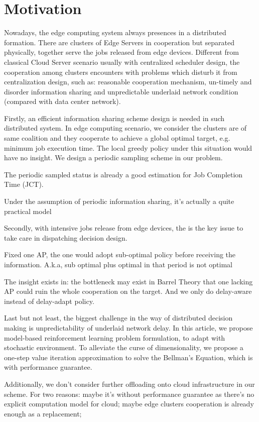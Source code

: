 \section{Motivation}
Nowadays, the edge computing system always presences in a distributed formation.
There are clusters of Edge Servers in cooperation but separated physically, together serve the jobs released from edge devices.
Different from classical Cloud Server scenario usually with centralized scheduler design, the cooperation among clusters encounters with problems which disturb it from centralization design, such as: reasonable cooperation mechanism, un-timely and disorder information sharing and unpredictable underlaid network condition (compared with data center network).

Firstly, an efficient information sharing scheme design is needed in such distributed system.
In edge computing scenario, we consider the clusters are of same coalition and they cooperate to achieve a global optimal target, e.g. minimum job execution time.
The local greedy policy under this situation would have no insight.
We design a periodic sampling scheme in our problem.
\begin{example}
    The periodic sampled status is already a good estimation for Job Completion Time (JCT).
\end{example}
Under the assumption of periodic information sharing, it's actually a quite practical model 

Secondly, with intensive jobs release from edge devices, the \brlatency is the key issue to take care in dispatching decision design.
\begin{example}
    Fixed one AP, the one would adopt sub-optimal policy before receiving the information. A.k.a, sub optimal plus optimal in that period is not optimal
\end{example}
The insight exists in: the bottleneck may exist in Barrel Theory that one lacking AP could ruin the whole cooperation on the target.
And we only do delay-aware instead of delay-adapt policy.

Last but not least, the biggest challenge in the way of distributed decision making is unpredictability of underlaid network delay.
In this article, we propose model-based reinforcement learning problem formulation, to adapt with stochastic environment.
To alleviate the curse of dimensionality, we propose a one-step value iteration approximation to solve the Bellman's Equation, which is with performance guarantee.

Additionally, we don't consider further offloading onto cloud infrastructure in our scheme.
For two reasons: maybe it's without performance guarantee as there's no explicit computation model for cloud; maybe edge clusters cooperation is already enough as a replacement; 
